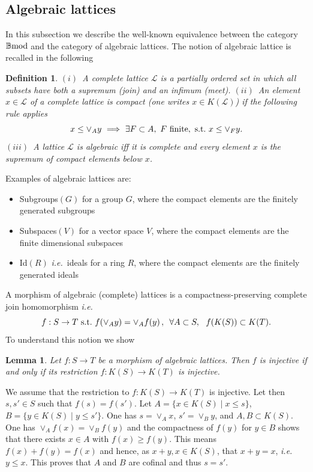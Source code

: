 \documentclass[12pt]{article}
\newtheorem{lem}[thm]{Lemma}
\newtheorem{defn}[thm]{Definition}
\def\B{{\mathbb B}}
\def\cL{{\mathcal L}}
\def\qqq{\,,\,~\forall}
\newcommand{\ie}{{\it i.e.\/}\ }
\def\bmod{{\rm \B mod}}
\begin{document}
\subsection{Algebraic lattices}\label{galois connect}

In this subsection we describe the well-known equivalence between the category $\bmod$ and the category of  algebraic  lattices. The notion of  algebraic  lattice is recalled in the following
\begin{defn} \label{defn complete lattice} $(i)$~A complete lattice $\cL$ is a partially ordered set in which all subsets have both a supremum (join) and an infimum (meet).	\newline
$(ii)$~An element $x\in \cL$ of a complete lattice is {\em compact} (one writes $x\in K(\cL)$) if the following rule applies 
$$
x\leq \vee_A y~\Longrightarrow~ \exists F\subset A,~F\ {\rm finite,~ s.t.}~ x\leq \vee_F y.
$$
$(iii)$~A  lattice $\cL$ is {\em algebraic} iff it is  complete and every element $x$ is the supremum of compact elements below $x$. \end{defn}

Examples of algebraic  lattices are:
\begin{itemize}
\item Subgroups$(G)$ for a group $G$, where the compact elements are the finitely generated subgroups
\item Subspaces$(V)$ for a vector space $V$, where the compact elements are the finite dimensional subspaces
\item Id$(R)$ \ie ideals for a ring $R$, where the compact elements are the finitely generated ideals
\end{itemize}

A morphism  of algebraic (complete) lattices is a compactness-preserving complete join homomorphism \ie  
\begin{equation}\label{compactness-preserving}
	f:S\to T~{\rm s.t.}~ f(\vee_A y)=\vee_A f(y)\qqq A\subset S,\ \ f(K(S))\subset K(T).
\end{equation}
To understand this notion we show
\begin{lem}\label{algebraic lattice inj} Let $f:S\to T$ be a morphism of algebraic lattices. Then $f$ is injective if and only if its restriction $f:K(S)\to K(T)$ is injective.	
\end{lem}
\proof We assume that the restriction to $f:K(S)\to K(T)$ is injective. Let then $s,s'\in S$ such that $f(s)=f(s')$. Let $A=\{x\in K(S)\mid x\leq s\}$, $B=\{y\in K(S)\mid y\leq s'\}$. One has $s=\vee_A x$, $s'=\vee_B y$, and $A,B\subset K(S)$. One has $\vee_A f(x)=\vee_B f(y)$ and the compactness of $f(y)$ for $y\in B$ shows that there exists $x\in A$ with $f(x)\geq f(y)$. This means $f(x)+f(y)=f(x)$ and hence, as $x+y,x\in K(S)$, that $x+y=x$, \ie $y\leq x$. This proves that $A$ and $B$ are cofinal and thus $s=s'$. \endproof 
 
\end{document}
